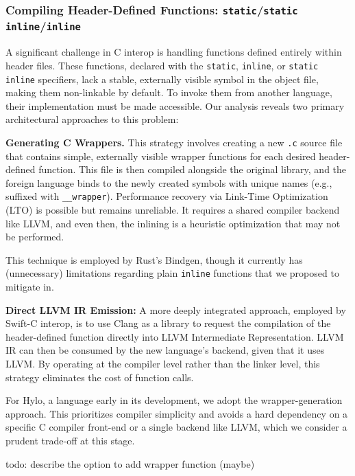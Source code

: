 \subsubsection{Compiling Header-Defined Functions: \texttt{static}/\texttt{static inline}/\texttt{inline}}
\label{ssec:handling-inline-c-functions}

A significant challenge in C interop is handling functions defined entirely within header files. These functions, declared with the \texttt{static}, \texttt{inline}, or \texttt{static inline} specifiers, lack a stable, externally visible symbol in the object file, making them non-linkable by default. To invoke them from another language, their implementation must be made accessible. Our analysis reveals two primary architectural approaches to this problem:

\textbf{Generating C Wrappers.} This strategy involves creating a new \texttt{.c} source file that contains simple, externally visible wrapper functions for each desired header-defined function. This file is then compiled alongside the original library, and the foreign language binds to the newly created symbols with unique names (e.g., suffixed with \texttt{\_\_wrapper}). Performance recovery via Link-Time Optimization (LTO) is possible but remains unreliable. It requires a shared compiler backend like LLVM, and even then, the inlining is a heuristic optimization that may not be performed.

This technique is employed by Rust's Bindgen, though it currently has (unnecessary) limitations regarding plain \texttt{inline} functions\cite{bindgen-inline-limitation} that we proposed to mitigate in\cite{bindgen-inline-proposal}.

\textbf{Direct LLVM IR Emission:} A more deeply integrated approach, employed by Swift-C interop, is to use Clang as a library to request the compilation of the header-defined function directly into LLVM Intermediate Representation. LLVM IR can then be consumed by the new language's backend, given that it uses LLVM. By operating at the compiler level rather than the linker level, this strategy eliminates the cost of function calls.

For Hylo, a language early in its development, we adopt the wrapper-generation approach. This prioritizes compiler simplicity and avoids a hard dependency on a specific C compiler front-end or a single backend like LLVM, which we consider a prudent trade-off at this stage.

todo: describe the option to add wrapper function (maybe)

